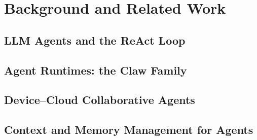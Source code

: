 \chapter{Background and Related Work}
\label{ch:background}

\section{LLM Agents and the ReAct Loop}
\label{sec:bg-react}

\section{Agent Runtimes: the Claw Family}
\label{sec:bg-runtimes}

\section{Device--Cloud Collaborative Agents}
\label{sec:bg-edgecloud}

\section{Context and Memory Management for Agents}
\label{sec:bg-context}

